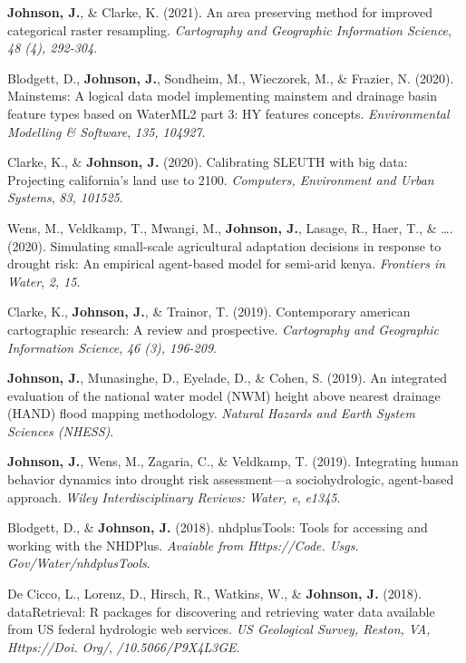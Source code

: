\documentclass[11pt,a4paper,]{awesome-cv}
\begin{document}
\leavevmode{}%
\textbf{Johnson, J.}, \& Clarke, K. (2021). An area preserving method
for improved categorical raster resampling. \emph{Cartography and
Geographic Information Science}, \emph{48 (4), 292-304}.

\leavevmode{}%
Blodgett, D., \textbf{Johnson, J.}, Sondheim, M., Wieczorek, M., \&
Frazier, N. (2020). Mainstems: A logical data model implementing
mainstem and drainage basin feature types based on WaterML2 part 3: HY
features concepts. \emph{Environmental Modelling \& Software},
\emph{135, 104927}.

\leavevmode{}%
Clarke, K., \& \textbf{Johnson, J.} (2020). Calibrating SLEUTH with big
data: Projecting california's land use to 2100. \emph{Computers,
Environment and Urban Systems}, \emph{83, 101525}.

\leavevmode{}%
Wens, M., Veldkamp, T., Mwangi, M., \textbf{Johnson, J.}, Lasage, R.,
Haer, T., \& \ldots. (2020). Simulating small-scale agricultural
adaptation decisions in response to drought risk: An empirical
agent-based model for semi-arid kenya. \emph{Frontiers in Water},
\emph{2, 15}.

\leavevmode{}%
Clarke, K., \textbf{Johnson, J.}, \& Trainor, T. (2019). Contemporary
american cartographic research: A review and prospective.
\emph{Cartography and Geographic Information Science}, \emph{46 (3),
196-209}.

\leavevmode{}%
\textbf{Johnson, J.}, Munasinghe, D., Eyelade, D., \& Cohen, S. (2019).
An integrated evaluation of the national water model (NWM) height above
nearest drainage (HAND) flood mapping methodology. \emph{Natural Hazards
and Earth System Sciences (NHESS)}.

\leavevmode{}%
\textbf{Johnson, J.}, Wens, M., Zagaria, C., \& Veldkamp, T. (2019).
Integrating human behavior dynamics into drought risk assessment---a
sociohydrologic, agent‐based approach. \emph{Wiley Interdisciplinary
Reviews: Water, e}, \emph{e1345}.

\leavevmode{}%
Blodgett, D., \& \textbf{Johnson, J.} (2018). nhdplusTools: Tools for
accessing and working with the NHDPlus. \emph{Avaiable from
Https://Code. Usgs. Gov/Water/nhdplusTools}.

\leavevmode{}%
De Cicco, L., Lorenz, D., Hirsch, R., Watkins, W., \&
\textbf{Johnson, J.} (2018). dataRetrieval: R packages for discovering
and retrieving water data available from US federal hydrologic web
services. \emph{US Geological Survey, Reston, VA, Https://Doi. Org/},
\emph{/10.5066/P9X4L3GE}.
\end{document}

